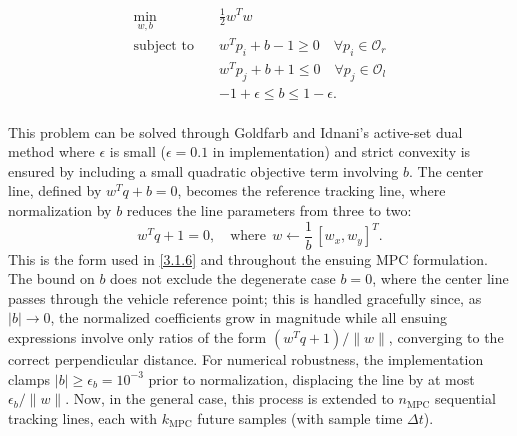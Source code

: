 \documentclass[journal]{IEEEtran}
\begin{document}
\begin{equation}
\begin{aligned}
\min_{w,b} \quad & \frac{1}{2}w^Tw \\
\text{subject to} \quad & w^Tp_i+b-1 \geq 0 \quad \forall p_i \in \mathcal{O}_r\\
                        & w^Tp_j+b+1 \leq 0 \quad \forall p_j \in \mathcal{O}_l\\
                        & -1+\epsilon \leq b \leq 1-\epsilon.\\
\end{aligned}
\label{quadprogopt}
\end{equation}

This problem can be solved through Goldfarb and Idnani's active-set dual method \cite{Goldfarb1983} where $\epsilon$ is small ($\epsilon=0.1$ in implementation) and strict convexity is ensured by including a small quadratic objective term involving $b$. The center line, defined by $w^Tq+b=0$, becomes the reference tracking line, where normalization by $b$ reduces the line parameters from three to two:
\begin{equation}
    w^Tq+1=0, \quad \text{where}\ \ w\leftarrow\frac{1}{b}\,[w_x,w_y]^T.
    \label{normline}
\end{equation}
This is the form used in \eqref{3.1.6} and throughout the ensuing MPC formulation. The bound on $b$ does not exclude the degenerate case $b=0$, where the center line passes through the vehicle reference point; this is handled gracefully since, as $|b|\rightarrow0$, the normalized coefficients grow in magnitude while all ensuing expressions involve only ratios of the form $(w^Tq+1)/\|w\|$, converging to the correct perpendicular distance. For numerical robustness, the implementation clamps $|b|\geq\epsilon_b=10^{-3}$ prior to normalization, displacing the line by at most $\epsilon_b/\|w\|$. Now, in the general case, this process is extended to $n_\text{MPC}$ sequential tracking lines, each with $k_\text{MPC}$ future samples (with sample time $\Delta t$).
\end{document}
